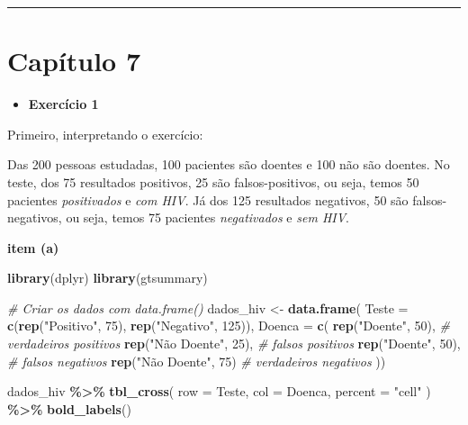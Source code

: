 \documentclass[
]{book}
\newenvironment{Shaded}{\begin{snugshade}}{\end{snugshade}}
\newcommand{\AttributeTok}[1]{\textcolor[rgb]{0.13,0.29,0.53}{#1}}
\newcommand{\CommentTok}[1]{\textcolor[rgb]{0.56,0.35,0.01}{\textit{#1}}}
\newcommand{\DecValTok}[1]{\textcolor[rgb]{0.00,0.00,0.81}{#1}}
\newcommand{\FunctionTok}[1]{\textcolor[rgb]{0.13,0.29,0.53}{\textbf{#1}}}
\newcommand{\NormalTok}[1]{#1}
\newcommand{\OtherTok}[1]{\textcolor[rgb]{0.56,0.35,0.01}{#1}}
\newcommand{\SpecialCharTok}[1]{\textcolor[rgb]{0.81,0.36,0.00}{\textbf{#1}}}
\newcommand{\StringTok}[1]{\textcolor[rgb]{0.31,0.60,0.02}{#1}}
\providecommand{\tightlist}{%
  \setlength{\itemsep}{0pt}\setlength{\parskip}{0pt}}
\begin{document}
\begin{center}\rule{0.5\linewidth}{0.5pt}\end{center}

\section{Capítulo 7}\label{capuxedtulo-7}

\begin{itemize}
\tightlist
\item
  \textbf{Exercício 1}
\end{itemize}

Primeiro, interpretando o exercício:

Das 200 pessoas estudadas, 100 pacientes são doentes e 100 não são doentes. No teste, dos 75 resultados positivos, 25 são falsos-positivos, ou seja, temos 50 pacientes \emph{positivados} e \emph{com HIV}. Já dos 125 resultados negativos, 50 são falsos-negativos, ou seja, temos 75 pacientes \emph{negativados} e \emph{sem HIV}.

\textbf{item (a)}

\begin{Shaded}
\begin{Highlighting}[]
\FunctionTok{library}\NormalTok{(dplyr)}
\FunctionTok{library}\NormalTok{(gtsummary)}

\CommentTok{\# Criar os dados com data.frame()}
\NormalTok{dados\_hiv }\OtherTok{\textless{}{-}} \FunctionTok{data.frame}\NormalTok{(}
  \AttributeTok{Teste =} \FunctionTok{c}\NormalTok{(}\FunctionTok{rep}\NormalTok{(}\StringTok{"Positivo"}\NormalTok{, }\DecValTok{75}\NormalTok{), }\FunctionTok{rep}\NormalTok{(}\StringTok{"Negativo"}\NormalTok{, }\DecValTok{125}\NormalTok{)),}
  \AttributeTok{Doenca =} \FunctionTok{c}\NormalTok{(}
    \FunctionTok{rep}\NormalTok{(}\StringTok{"Doente"}\NormalTok{, }\DecValTok{50}\NormalTok{),        }\CommentTok{\# verdadeiros positivos}
    \FunctionTok{rep}\NormalTok{(}\StringTok{"Não Doente"}\NormalTok{, }\DecValTok{25}\NormalTok{),    }\CommentTok{\# falsos positivos}
    \FunctionTok{rep}\NormalTok{(}\StringTok{"Doente"}\NormalTok{, }\DecValTok{50}\NormalTok{),        }\CommentTok{\# falsos negativos}
    \FunctionTok{rep}\NormalTok{(}\StringTok{"Não Doente"}\NormalTok{, }\DecValTok{75}\NormalTok{)     }\CommentTok{\# verdadeiros negativos }
\NormalTok{))}

\NormalTok{dados\_hiv }\SpecialCharTok{\%\textgreater{}\%}
  \FunctionTok{tbl\_cross}\NormalTok{(}
    \AttributeTok{row =}\NormalTok{ Teste,}
    \AttributeTok{col =}\NormalTok{ Doenca,}
    \AttributeTok{percent =} \StringTok{"cell"}
\NormalTok{  ) }\SpecialCharTok{\%\textgreater{}\%}
  \FunctionTok{bold\_labels}\NormalTok{()}
\end{Highlighting}
\end{Shaded}
\end{document}
